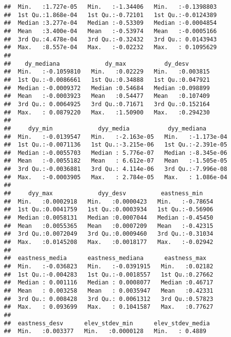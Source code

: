\documentclass[11pt,]{article}
\begin{document}
\begin{verbatim}
##  Min.   :1.727e-05   Min.   :-1.34406   Min.   :-0.1398803  
##  1st Qu.:1.868e-04   1st Qu.:-0.72101   1st Qu.:-0.0124389  
##  Median :3.277e-04   Median :-0.53309   Median :-0.0004854  
##  Mean   :3.400e-04   Mean   :-0.53974   Mean   :-0.0005166  
##  3rd Qu.:4.478e-04   3rd Qu.:-0.32432   3rd Qu.: 0.0143943  
##  Max.   :8.557e-04   Max.   :-0.02232   Max.   : 0.1095629  
##                                                             
##    dy_mediana             dy_max           dy_desv        
##  Min.   :-0.1059810   Min.   :0.02229   Min.   :0.003815  
##  1st Qu.:-0.0086661   1st Qu.:0.34888   1st Qu.:0.047921  
##  Median :-0.0009372   Median :0.54684   Median :0.098899  
##  Mean   :-0.0003923   Mean   :0.54477   Mean   :0.107409  
##  3rd Qu.: 0.0064925   3rd Qu.:0.71671   3rd Qu.:0.152164  
##  Max.   : 0.0879220   Max.   :1.50900   Max.   :0.294230  
##                                                           
##     dyy_min             dyy_media           dyy_mediana        
##  Min.   :-0.0139547   Min.   :-2.163e-05   Min.   :-1.173e-04  
##  1st Qu.:-0.0071136   1st Qu.:-3.215e-06   1st Qu.:-2.391e-05  
##  Median :-0.0055703   Median : 5.776e-07   Median :-8.345e-06  
##  Mean   :-0.0055182   Mean   : 6.612e-07   Mean   :-1.505e-05  
##  3rd Qu.:-0.0036881   3rd Qu.: 4.114e-06   3rd Qu.:-7.996e-08  
##  Max.   :-0.0003905   Max.   : 2.784e-05   Max.   : 1.086e-04  
##                                                                
##     dyy_max             dyy_desv          eastness_min     
##  Min.   :0.0002918   Min.   :0.0000423   Min.   :-0.78654  
##  1st Qu.:0.0041759   1st Qu.:0.0003934   1st Qu.:-0.56906  
##  Median :0.0058131   Median :0.0007044   Median :-0.45450  
##  Mean   :0.0055365   Mean   :0.0007209   Mean   :-0.42315  
##  3rd Qu.:0.0072049   3rd Qu.:0.0009460   3rd Qu.:-0.31034  
##  Max.   :0.0145208   Max.   :0.0018177   Max.   :-0.02942  
##                                                            
##  eastness_media      eastness_mediana      eastness_max    
##  Min.   :-0.036823   Min.   :-0.0391915   Min.   :0.02182  
##  1st Qu.:-0.004283   1st Qu.:-0.0018557   1st Qu.:0.27662  
##  Median : 0.001116   Median : 0.0008077   Median :0.46717  
##  Mean   : 0.003258   Mean   : 0.0035947   Mean   :0.42331  
##  3rd Qu.: 0.008428   3rd Qu.: 0.0061312   3rd Qu.:0.57823  
##  Max.   : 0.093699   Max.   : 0.1041587   Max.   :0.77627  
##                                                            
##  eastness_desv      elev_stdev_min      elev_stdev_media 
##  Min.   :0.003377   Min.   :0.0000128   Min.   : 0.4889  

\end{verbatim}
\end{document}
